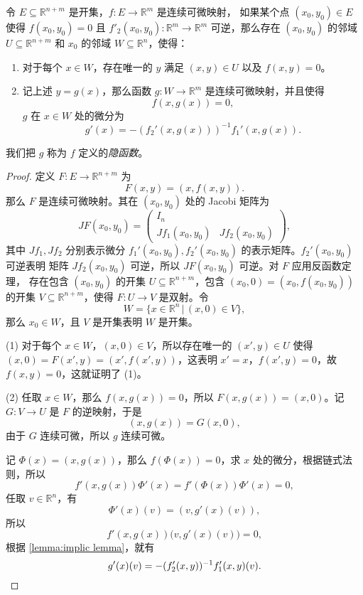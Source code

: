 \documentclass[fontset=none,zihao=-4]{Notes}
\begin{document}
\begin{theorem}[隐函数定理]
  令 $E\subseteq\mathbb{R}^{n+m}$ 是开集，$f:E\to\mathbb{R}^m$ 是连续可微映射，
  如果某个点 $(x_0,y_0)\in E$ 使得 $f(x_0,y_0)=0$ 且 $f'_2(x_0,y_0):\mathbb{R}^{m}\to\mathbb{R}^m$ 
  可逆，那么存在 $(x_0,y_0)$ 的邻域 $U\subseteq\mathbb{R}^{n+m}$ 和
  $x_0$ 的邻域 $W\subseteq\mathbb{R}^n$，使得：
  \begin{enumerate}
    \item 对于每个 $x\in W$，存在唯一的 $y$ 满足 $(x,y)\in U$ 以及 $f(x,y)=0$。
    \item 记上述 $y=g(x)$，那么函数 $g:W\to \mathbb{R}^m$ 是连续可微映射，并且使得
    \[
      f(x,g(x))=0,  
    \]
    $g$ 在 $x\in W$ 处的微分为
    \[
      g'(x)=-(f_2'(x,g(x)))^{-1}f_1'(x,g(x)).  
    \]
  \end{enumerate}
  我们把 $g$ 称为 $f$ 定义的\emph{隐函数}。
\end{theorem}
\begin{proof}
  定义 $F:E\to\mathbb{R}^{n+m}$ 为
  \[
    F(x,y)=(x,f(x,y)).  
  \]
  那么 $F$ 是连续可微映射。其在 $(x_0,y_0)$ 处的 Jacobi 矩阵为
  \[
    JF(x_0,y_0)=\begin{pmatrix}
      I_n &  \\
      Jf_1(x_0,y_0) & Jf_2(x_0,y_0)
    \end{pmatrix}  ,
  \]
  其中 $Jf_1,Jf_2$ 分别表示微分 $f_1'(x_0,y_0),f_2'(x_0,y_0)$ 的表示矩阵。$f_2'(x_0,y_0)$ 可逆表明
  矩阵 $Jf_2(x_0,y_0)$ 可逆，所以 $JF(x_0,y_0)$ 可逆。对 $F$ 应用反函数定理，
  存在包含 $(x_0,y_0)$ 的开集 $U\subseteq\mathbb{R}^{n+m}$，包含
  $(x_0,0)=(x_0,f(x_0,y_0))$ 的开集 $V\subseteq\mathbb{R}^{n+m}$，使得
  $F:U\to V$ 是双射。令
  \[
    W=\{x\in\mathbb{R}^n\,|\, (x,0)\in V\}  ,
  \]
  那么 $x_0\in W$，且 $V$ 是开集表明 $W$ 是开集。

  (1) 对于每个 $x\in W$，$(x,0)\in V$，所以存在唯一的 $(x',y)\in U$
  使得 $(x,0)=F(x',y)=(x',f(x',y))$，这表明 $x'=x$，$f(x',y)=0$，故
  $f(x,y)=0$，这就证明了 (1)。

  (2) 任取 $x\in W$，那么 $f(x,g(x))=0$，所以 $F(x,g(x))=(x,0)$。记
  $G:V\to U$ 是 $F$ 的逆映射，于是
  \[
    (x,g(x))=G(x,0),
  \]
  由于 $G$ 连续可微，所以 $g$ 连续可微。
  
  记 $\Phi(x)=(x,g(x))$，那么 $f(\Phi(x))=0$，求 $x$ 处的微分，根据链式法则，所以
  \[
    f'(x,g(x))\Phi'(x)=f'(\Phi(x))\Phi'(x)=0,  
  \]
  任取 $v\in\mathbb{R}^n$，有
  \[
    \Phi'(x)(v)=(v,g'(x)(v)),
  \]
  所以
  \[
    f'(x,g(x))\bigl(v,g'(x)(v)\bigr)  =0,
  \]
  根据 \autoref{lemma:implic lemma}，就有
  \[
    g'(x)(v)=-(f_2'(x,y))  ^{-1} f_1'(x,y)(v).\qedhere
  \]
\end{proof}
\end{document}
